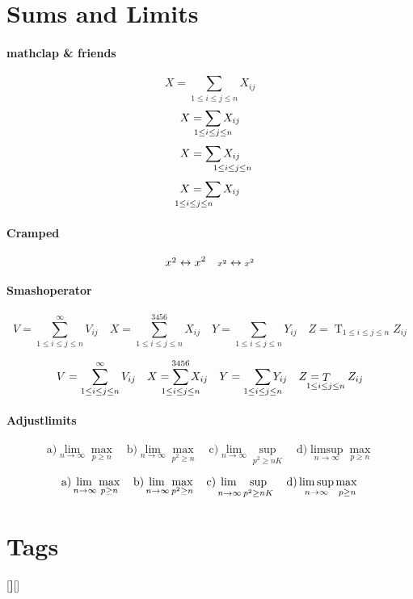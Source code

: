 \documentclass{article}
\begin{document}
\section{Sums and Limits}
\paragraph{mathclap \& friends}
\[
X = \sum_{1\le i\le j\le n} X_{ij}
\]
\[
X = \sum_{\mathclap{1\le i\le j\le n}} X_{ij}
\]
\[
X = \sum_{\mathrlap{1\le i\le j\le n}} X_{ij}
\]
\[
X = \sum_{\mathllap{1\le i\le j\le n}} X_{ij}
\]

\paragraph{Cramped}
\[
\cramped{x^2} \leftrightarrow x^2 \quad
\cramped[\scriptstyle]{x^2} \leftrightarrow {\scriptstyle x^2}
\]

\paragraph{Smashoperator}
\[
V = \sum_{1\le i\le j\le n}^{\infty} V_{ij} \quad
X = \sum_{1\le i\le j\le n}^{3456} X_{ij} \quad
Y = \sum\limits_{1\le i\le j\le n} Y_{ij} \quad
Z = \mathop{T}_{1\le i\le j\le n} Z_{ij}
\]

\[
V = \sum_{1\le i\le j\le n}^{\infty} V_{ij} \quad
X = \smashoperator{\sum_{1\le i\le j\le n}^{3456}} X_{ij} \quad
Y = \smashoperator[r]{\sum\limits_{1\le i\le j\le n}} Y_{ij} \quad
Z = \smashoperator[l]{\mathop{T}_{1\le i\le j\le n}} Z_{ij}
\]

\paragraph{Adjustlimits}

\[
\text{a)} \lim_{n\to\infty} \max_{p\ge n} \quad
\text{b)} \lim_{n\to\infty} \max_{p^2\ge n} \quad
\text{c)} \lim_{n\to\infty} \sup_{p^2\ge nK} \quad
\text{d)} \limsup_{n\to\infty} \max_{p\ge n}
\]

\[
\text{a)} \adjustlimits\lim_{n\to\infty} \max_{p\ge n} \quad
\text{b)} \adjustlimits\lim_{n\to\infty} \max_{p^2\ge n} \quad
\text{c)} \adjustlimits\lim_{n\to\infty} \sup_{p^2\ge nK} \quad
\text{d)} \adjustlimits\limsup_{n\to\infty} \max_{p\ge n}
\]

\section{Tags}
[\textbf]{[}{]}
\end{document}
